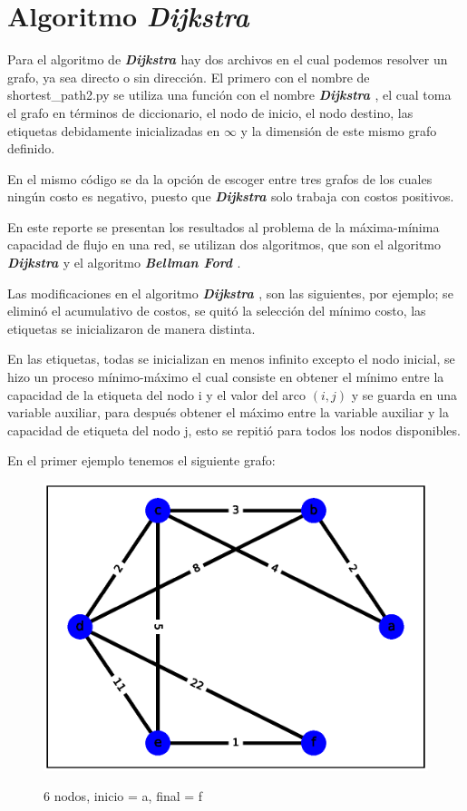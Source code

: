 \documentclass{report}
\newcommand{\dij}{{\bfseries {\textit{Dijkstra }}}}
\newcommand{\bell}{{\bfseries {\textit{Bellman Ford }}}}
\begin{document}
\tableofcontents
\newpage
\section{Algoritmo \dij}
Para el algoritmo de \dij hay dos archivos en el cual podemos resolver un grafo, ya sea directo o sin dirección. El primero con el nombre de shortest\_path2.py se utiliza una función con el nombre \dij, el cual toma el grafo en términos de diccionario, el nodo de inicio, el nodo destino, las etiquetas debidamente inicializadas en $\infty$ y la dimensión de este mismo grafo definido.

En el mismo código se da la opción de escoger entre tres grafos de los cuales ningún costo es negativo, puesto que \dij solo trabaja con costos positivos.

En este reporte se presentan los resultados al problema de la máxima-mínima capacidad de flujo en una red, se utilizan dos algoritmos, que son el algoritmo \dij y el algoritmo \bell.

Las modificaciones en el algoritmo \dij, son las siguientes, por ejemplo; se eliminó el acumulativo de costos, se quitó la selección del mínimo costo, las etiquetas se inicializaron de manera distinta.

En las etiquetas, todas se inicializan en menos infinito excepto el nodo inicial, se hizo un proceso mínimo-máximo el cual consiste en obtener el mínimo entre la capacidad de la etiqueta del nodo i y el valor del arco $(i,j)$ y se guarda en una variable auxiliar, para después obtener el máximo entre la variable auxiliar y la capacidad de etiqueta del nodo j, esto se repitió para todos los nodos disponibles.

En el primer ejemplo tenemos el siguiente grafo:
\begin{figure}[ht]
    \centering
    \includegraphics[scale = 0.4]{ejemplo1.eps}
    \label{figura1}
    \caption{6 nodos, inicio = a, final = f}
\end{figure}
\end{document}
